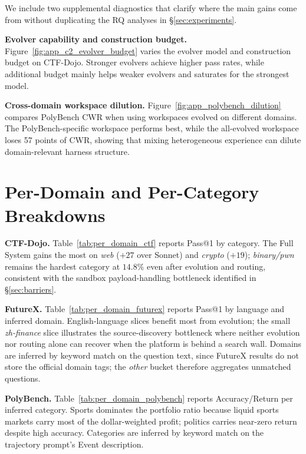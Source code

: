 We include two supplemental diagnostics that clarify where the main gains come from without duplicating the RQ analyses in \S\ref{sec:experiments}.

\noindent\textbf{Evolver capability and construction budget.}
Figure~\ref{fig:app_c2_evolver_budget} varies the evolver model and construction budget on CTF-Dojo. Stronger evolvers achieve higher pass rates, while additional budget mainly helps weaker evolvers and saturates for the strongest model.



\noindent\textbf{Cross-domain workspace dilution.}
Figure~\ref{fig:app_polybench_dilution} compares PolyBench CWR when using workspaces evolved on different domains. The PolyBench-specific workspace performs best, while the all-evolved workspace loses 57 points of CWR, showing that mixing heterogeneous experience can dilute domain-relevant harness structure.


\section{Per-Domain and Per-Category Breakdowns}
\label{app:per_domain}

\noindent\textbf{CTF-Dojo.}
Table~\ref{tab:per_domain_ctf} reports Pass@1 by category. The Full System gains the most on \emph{web} ($+27$ over Sonnet) and \emph{crypto} ($+19$); \emph{binary/pwn} remains the hardest category at $14.8\%$ even after evolution and routing, consistent with the sandbox payload-handling bottleneck identified in \S\ref{sec:barriers}.



\noindent\textbf{FutureX.}
Table~\ref{tab:per_domain_futurex} reports Pass@1 by language and inferred domain. English-language slices benefit most from evolution; the small \emph{zh-finance} slice illustrates the source-discovery bottleneck where neither evolution nor routing alone can recover when the platform is behind a search wall. Domains are inferred by keyword match on the question text, since FutureX results do not store the official domain tags; the \textit{other} bucket therefore aggregates unmatched questions.



\noindent\textbf{PolyBench.}
Table~\ref{tab:per_domain_polybench} reports Accuracy/Return per inferred category. Sports dominates the portfolio ratio because liquid sports markets carry most of the dollar-weighted profit; politics carries near-zero return despite high accuracy. Categories are inferred by keyword match on the trajectory prompt's Event description.

